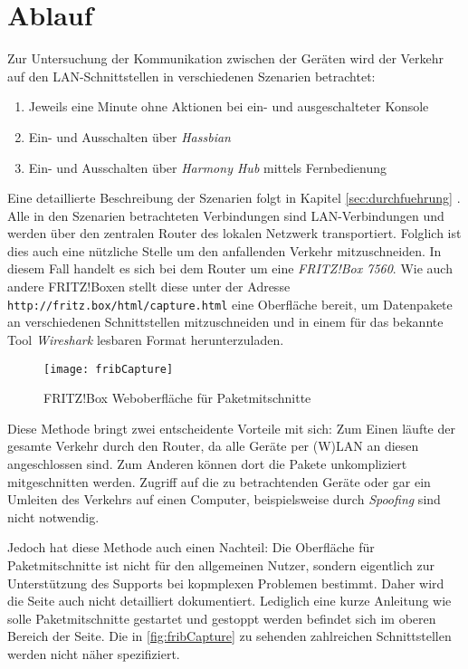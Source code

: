 \newpage
\section{Ablauf}\label{sec:ablauf}
Zur Untersuchung der Kommunikation zwischen der Geräten wird der Verkehr auf den LAN-Schnittstellen in verschiedenen Szenarien betrachtet:

\begin{enumerate}
    \setlength\itemsep{-0.5em}
    \item Jeweils eine Minute ohne Aktionen bei ein- und ausgeschalteter Konsole
    \item Ein- und Ausschalten über \textit{Hassbian}
    \item Ein- und Ausschalten über \textit{Harmony Hub} mittels Fernbedienung
\end{enumerate}

Eine detaillierte Beschreibung der Szenarien folgt in Kapitel \ref{sec:durchfuehrung} \textit{}.
Alle in den Szenarien betrachteten Verbindungen sind LAN-Verbindungen und werden über den zentralen Router des lokalen Netzwerk transportiert.
Folglich ist dies auch eine nützliche Stelle um den anfallenden Verkehr mitzuschneiden.
In diesem Fall handelt es sich bei dem Router um eine \textit{FRITZ!Box 7560}\cite{FRITZBox29:online}.
Wie auch andere FRITZ!Boxen stellt diese unter der Adresse \nolinkurl{http://fritz.box/html/capture.html} eine Oberfläche bereit,
um Datenpakete an verschiedenen Schnittstellen mitzuschneiden
und in einem für das bekannte Tool \textit{Wireshark} lesbaren Format herunterzuladen.

\begin{figure}[ht!]
    \centering
    \texttt{[image: fribCapture]}
    \caption{FRITZ!Box Weboberfläche für Paketmitschnitte}\label{fig:fribCapture}
\end{figure}

Diese Methode bringt zwei entscheidente Vorteile mit sich:
Zum Einen läufte der gesamte Verkehr durch den Router, da alle Geräte per (W)LAN an diesen angeschlossen sind.
Zum Anderen können dort die Pakete unkompliziert mitgeschnitten werden. Zugriff auf die zu betrachtenden Geräte
oder gar ein Umleiten des Verkehrs auf einen Computer, beispielsweise durch \textit{Spoofing}\cite{Maninthe12:online} sind nicht notwendig.

Jedoch hat diese Methode auch einen Nachteil:
Die Oberfläche für Paketmitschnitte ist nicht für den allgemeinen Nutzer,
sondern eigentlich zur Unterstützung des Supports bei kopmplexen Problemen bestimmt.
Daher wird die Seite auch nicht detailliert dokumentiert.
Lediglich eine kurze Anleitung wie solle Paketmitschnitte gestartet und gestoppt werden befindet sich im oberen Bereich der Seite.
Die in \autoref{fig:fribCapture} zu sehenden zahlreichen Schnittstellen werden nicht näher spezifiziert.

